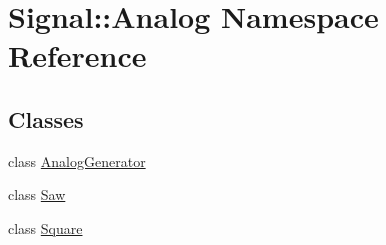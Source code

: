 \hypertarget{namespaceSignal_1_1Analog}{\section{Signal\+:\+:Analog Namespace Reference}
\label{namespaceSignal_1_1Analog}
}
\subsection*{Classes}
\begin{DoxyCompactItemize}
\item 
class \hyperlink{classSignal_1_1Analog_1_1AnalogGenerator}{Analog\+Generator}
\item 
class \hyperlink{classSignal_1_1Analog_1_1Saw}{Saw}
\item 
class \hyperlink{classSignal_1_1Analog_1_1Square}{Square}
\end{DoxyCompactItemize}
